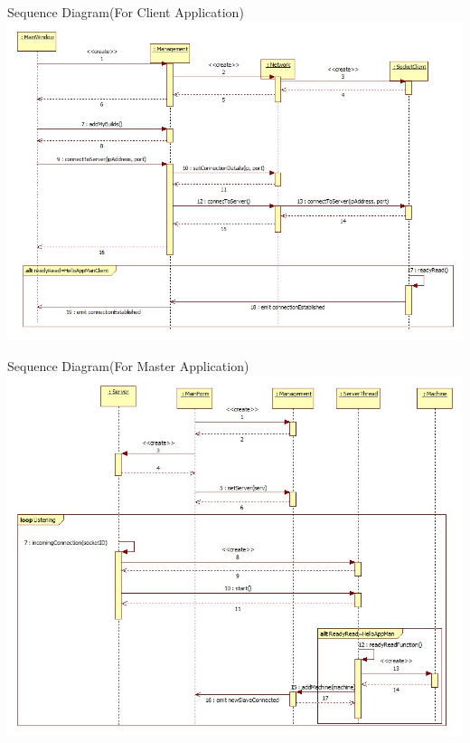 \documentclass[a4paper,12pt,final]{article}
\begin{document}
\newpage
\begin{center}
Sequence Diagram(For Client Application)
\includegraphics[scale=0.4]{CommunicationProtocol/SequenceDiagrams/Client/Connect.jpg} 
\end{center}
\begin{center}
Sequence Diagram(For Master Application)
\includegraphics[scale=0.4]{CommunicationProtocol/SequenceDiagrams/Server/Connect.jpeg} 
\end{center}


\end{document}

